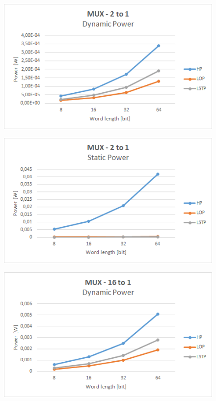\begin{figure}[!h]
	\centering
	\includegraphics[scale=0.8]{immagini/2to1D}
	\caption{\textit{}} 
	\label{1}
\end{figure}
\newpage
\begin{figure}[!h]
	\centering
	\includegraphics[scale=0.8]{immagini/2to1S}
	\caption{\textit{}} 
	\label{2}
\end{figure}

\begin{figure}[!h]
	\centering
	\includegraphics[scale=0.8]{immagini/16to1D}
	\caption{\textit{}} 
	\label{3}
\end{figure}

